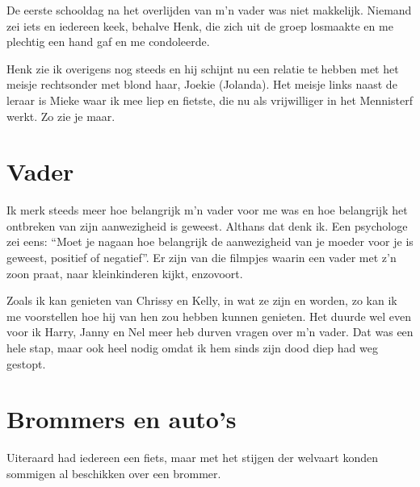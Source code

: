 \documentclass[10pt,twoside, openright]{memoir}
\begin{document}
De eerste schooldag na het overlijden van m’n vader was niet makkelijk. Niemand zei iets en iedereen keek, behalve Henk, die zich uit de groep losmaakte en me plechtig een hand gaf en me condoleerde. 

Henk zie ik overigens nog steeds en hij schijnt nu een relatie te hebben met het meisje rechtsonder met blond haar, Joekie (Jolanda). Het meisje links naast de leraar is Mieke waar ik mee liep en fietste, die nu als vrijwilliger in het Mennisterf werkt. Zo zie je maar.

\section{Vader} %
\label{cha:vader}

Ik merk steeds meer hoe belangrijk m'n vader voor me was en hoe belangrijk het ontbreken van zijn aanwezigheid is geweest. Althans dat denk ik. Een psychologe zei eens: ``Moet je nagaan hoe belangrijk de aanwezigheid van je moeder voor je is geweest, positief of negatief''. Er zijn van die filmpjes waarin een vader met z'n zoon praat, naar kleinkinderen kijkt, enzovoort.

Zoals ik kan genieten van Chrissy en Kelly, in wat ze zijn en worden, zo kan ik me voorstellen hoe hij van hen zou hebben kunnen genieten. Het duurde wel even voor ik Harry, Janny en Nel meer heb durven vragen over m'n vader. Dat was een hele stap, maar ook heel nodig omdat ik hem sinds zijn dood diep had weg gestopt. 

\section{Brommers en auto's} %
\label{cha:brommers_autos}

Uiteraard had iedereen een fiets, maar met het stijgen der welvaart konden sommigen al beschikken over een brommer. 
\end{document}
